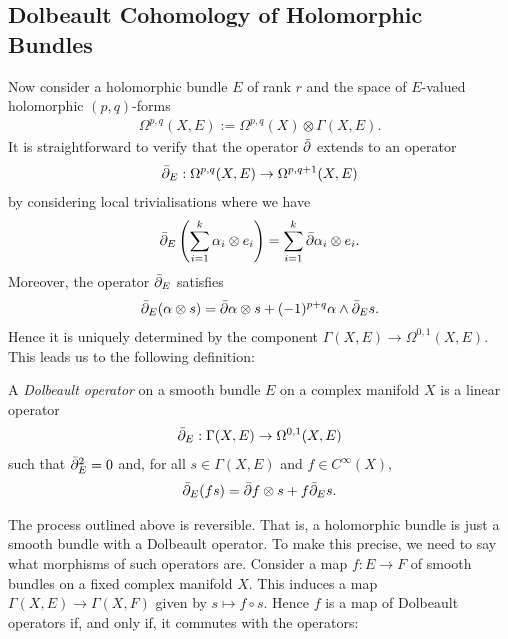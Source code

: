 \documentclass[12pt]{ociamthesis}  %
\begin{document}
\subsection{Dolbeault Cohomology of Holomorphic Bundles}

Now consider a holomorphic bundle $E$ of rank $r$ and the space of
$E$-valued holomorphic $(p,q)$-forms
\begin{align*}
  \Omega^{p,q}(X,E) := \Omega^{p,q}(X)\otimes\Gamma(X,E).
\end{align*}
It is straightforward to verify that the operator $\bar{\partial}$ extends
to an operator
\begin{align}\label{eq:general_dolbeault_operator}
  \bar{\partial}_E : \Omega^{p,q}(X,E) \to \Omega^{p,q+1}(X,E)
\end{align}
by considering local trivialisations where we have
\begin{align*}
  \bar{\partial}_E \left({\sum_{i=1}^k \alpha_i \otimes e_i}\right)
  = \sum_{i=1}^k \bar{\partial} \alpha_i \otimes e_i.
\end{align*}
Moreover, the operator $\bar{\partial}_E$ satisfies
\begin{align*}
  \bar{\partial}_E(\alpha \otimes s) = \bar{\partial}\alpha \otimes s + (-1)^{p+q} \alpha \wedge \bar{\partial}_E s.
\end{align*}
Hence it is uniquely determined by the component
$\Gamma(X,E) \to \Omega^{0,1}(X,E)$. This leads us to the following
definition:

\begin{definition}
  A \emph{Dolbeault operator} on a smooth bundle $E$ on a complex
  manifold $X$ is a linear operator
  \begin{align*}
    \bar{\partial}_E : \Gamma(X,E) \to \Omega^{0,1}(X,E)
  \end{align*}
  such that $\bar{\partial}_E^2 = 0$ and, for all $s\in\Gamma(X,E)$ and
  $f\in C^\infty(X)$,
  \begin{align*}
    \bar{\partial}_E (fs) = \bar{\partial} f\otimes s + f \bar{\partial}_E s.
  \end{align*}
\end{definition}

The process outlined above is reversible. That is, a holomorphic
bundle is just a smooth bundle with a Dolbeault operator. To make
this precise, we need to say what morphisms of such operators are.
Consider a map $f : E \to F$ of smooth bundles on a fixed complex
manifold $X$. This induces a map $\Gamma(X,E)\to\Gamma(X,F)$
given by $s \mapsto f\circ s$. Hence $f$ is a map of Dolbeault operators
if, and only if, it commutes with the operators:
\end{document}
